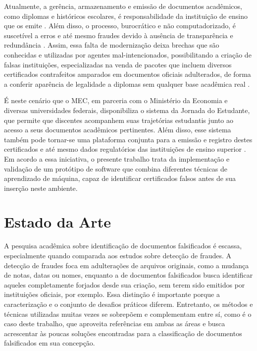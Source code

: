 \documentclass[12pt]{article}
\begin{document}
Atualmente, a gerência, armazenamento e emissão de documentos acadêmicos, como diplomas e históricos escolares, é responsabilidade da instituição de ensino que os emite \cite{mec:1978}. Além disso, o processo, burocrático e não computadorizado, é suscetível a erros e até mesmo fraudes devido à ausência de transparência e redundância \cite{palma:2019}. Assim, essa falta de modernização deixa brechas que são conhecidas e utilizadas por agentes mal-intencionados, possibilitando a criação de falsas instituições, especializadas na venda de pacotes que incluem diversos certificados contrafeitos amparados em documentos oficiais adulterados, de forma a conferir aparência de legalidade a diplomas sem qualquer base acadêmica real \cite{dias:2022}.

É neste cenário que o MEC, em parceria com o Ministério da Economia e diversas universidades federais, disponibiliza o sistema da Jornada do Estudante, que permite que discentes acompanhem suas trajetórias estudantis junto ao acesso a seus documentos acadêmicos pertinentes. Além disso, esse sistema também pode tornar-se uma plataforma conjunta para a emissão e registro destes certificados e até mesmo dados regulatórios das instituições de ensino superior \cite{rnp:2023}. Em acordo a essa iniciativa, o presente trabalho trata da implementação e validação de um protótipo de software que combina diferentes técnicas de aprendizado de máquina, capaz de identificar certificados falsos antes de sua inserção neste ambiente.

\section{Estado da Arte}

A pesquisa acadêmica sobre identificação de documentos falsificados é escassa, especialmente quando comparada aos estudos sobre detecção de fraudes. A detecção de fraudes foca em adulterações de arquivos originais, como a mudança de notas, datas ou nomes, enquanto a de documentos falsificados busca identificar aqueles completamente forjados desde sua criação, sem terem sido emitidos por instituições oficiais, por exemplo. Essa distinção é importante porque a caracterização e o conjunto de desafios práticos diferem. Entretanto, os métodos e técnicas utilizadas muitas vezes se sobrepõem e complementam entre sí, como é o caso deste trabalho, que aproveita referências em ambas as áreas e busca acrescentar às poucas soluções encontradas para a classificação de documentos falsificados em sua concepção.
\end{document}
